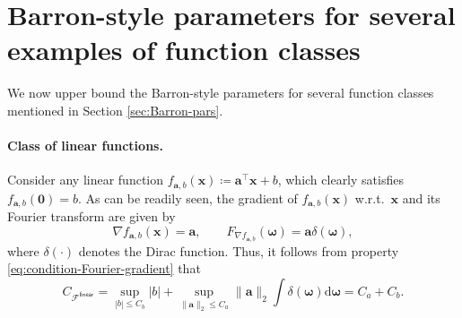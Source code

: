 \documentclass[english]{article}
\begin{document}
\section{Barron-style parameters for several examples of function classes}
\label{app:calculation-CF}

We now upper bound the Barron-style parameters for several function classes mentioned in Section \ref{sec:Barron-pars}.

 
\paragraph{Class of linear functions.}
%
Consider any  linear function $f_{\bm{a},b}({\bm x}) \coloneqq {\bm a}^{\top}{\bm x} + b$, which clearly satisfies $f_{\bm{a},b}({\bm 0})=b$.   
As can be readily seen,  the gradient of $f_{\bm{a},b}({\bm x})$ w.r.t.~$\bm{x}$ and its Fourier transform are given by
$$
\nabla f_{\bm{a},b}({\bm x}) = {\bm a},\qquad F_{\nabla f_{\bm{a},b}}({\bm \omega}) = {\bm a}\delta({\bm \omega}),
$$
where $\delta(\cdot)$ denotes the Dirac function.
Thus, it follows from property \eqref{eq:condition-Fourier-gradient} that
$$
C_{\mathcal{F}^{\mathsf{linear}}} = \sup_{|b|\le C_b}|b| + \sup_{\|{\bm a}\|_2\le C_a}\|{\bm a}\|_2\int  \delta({\bm \omega})\mathrm{d}{\bm \omega} = C_a + C_b.
$$

\end{document}

